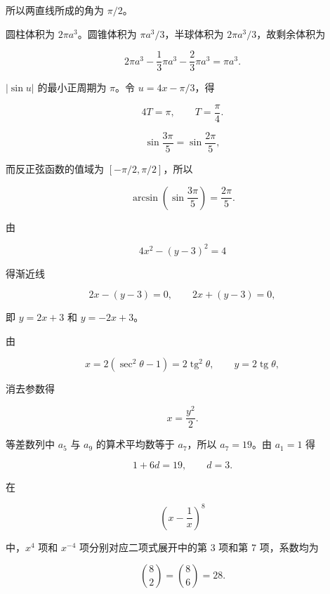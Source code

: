 \begin{answer}
所以两直线所成的角为 $\pi/2$。


圆柱体积为 $2\pi a^3$。圆锥体积为 $\pi a^3/3$，半球体积为 $2\pi a^3/3$，故剩余体积为

\nopagebreak[4]
\[
2\pi a^3-\frac13\pi a^3-\frac23\pi a^3
=\pi a^3.
\]


$|\sin u|$ 的最小正周期为 $\pi$。令 $u=4x-\pi/3$，得

\nopagebreak[4]
\[
4T=\pi,\qquad T=\frac\pi4.
\]


\nopagebreak[4]
\[
\sin\frac{3\pi}{5}=\sin\frac{2\pi}{5},
\]

而反正弦函数的值域为 $[-\pi/2,\pi/2]$，所以

\nopagebreak[4]
\[
\arcsin\left(\sin\frac{3\pi}{5}\right)=\frac{2\pi}{5}.
\]


由

\nopagebreak[4]
\[
4x^2-(y-3)^2=4
\]

得渐近线

\nopagebreak[4]
\[
2x-(y-3)=0,\qquad 2x+(y-3)=0,
\]

即 $y=2x+3$ 和 $y=-2x+3$。


由

\nopagebreak[4]
\[
x=2(\sec^2\theta-1)=2\operatorname{tg}^2\theta,
\qquad
y=2\operatorname{tg}\theta,
\]

消去参数得

\nopagebreak[4]
\[
x=\frac{y^2}{2}.
\]


等差数列中 $a_5$ 与 $a_9$ 的算术平均数等于 $a_7$，所以 $a_7=19$。由 $a_1=1$ 得

\nopagebreak[4]
\[
1+6d=19,\qquad d=3.
\]


在

\nopagebreak[4]
\[
\left(x-\frac1x\right)^8
\]

中，$x^4$ 项和 $x^{-4}$ 项分别对应二项式展开中的第 3 项和第 7 项，系数均为

\nopagebreak[4]
\[
\binom82=\binom86=28.
\]


\end{answer}
